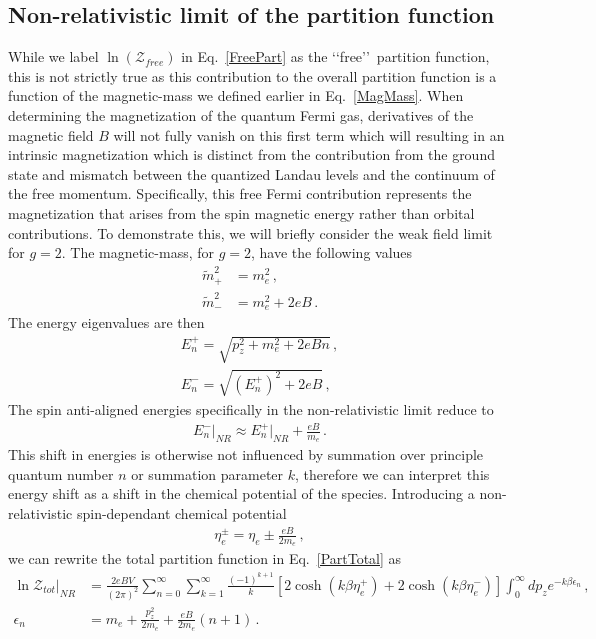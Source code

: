 \documentclass[Universe,article,submit,moreauthors,pdftex]{Definitions/mdpi}
\newcommand*{\req}[1]{Eq.~{\eqref{#1}}}
\begin{document}
\subsection{Non-relativistic limit of the partition function}
While we label $\ln(\mathcal{Z}_{free})$ in \req{FreePart} as the \lq\lq free\rq\rq\ partition function, this is not strictly true as this contribution to the overall partition function is a function of the magnetic-mass we defined earlier in \req{MagMass}. When determining the magnetization of the quantum Fermi gas, derivatives of the magnetic field $B$ will not fully vanish on this first term which will resulting in an intrinsic magnetization which is distinct from the contribution from the ground state and mismatch between the quantized Landau levels and the continuum of the free momentum. Specifically, this free Fermi contribution represents the magnetization that arises from the spin magnetic energy rather than orbital contributions. To demonstrate this, we will briefly consider the weak field limit for $g=2$. The magnetic-mass, for $g=2$, have the following values
\begin{align}
  \label{MagMassPlus} \tilde{m}_{+}^{2}&=m_{e}^{2}\,,\\
  \label{MagMassMinus} \tilde{m}_{-}^{2}&=m_{e}^{2}+2eB\,.
\end{align}
The energy eigenvalues are then
\begin{align}
  \label{EPlus} E_{n}^{+}=\sqrt{p_{z}^{2}+m_{e}^{2}+2eBn}\,,\\
  \label{EMinus} E_{n}^{-}=\sqrt{\left(E_{n}^{+}\right)^{2}+2eB}\,,
\end{align}
The spin anti-aligned energies specifically in the non-relativistic limit reduce to
\begin{align}
  \label{EMinusNR} E_{n}^{-}\vert_{NR}\approx E_{n}^{+}\vert_{NR}+\frac{eB}{m_{e}}\,.
\end{align}
This shift in energies is otherwise not influenced by summation over principle quantum number $n$ or summation parameter $k$, therefore we can interpret this energy shift as a shift in the chemical potential of the species. Introducing a non-relativistic spin-dependant chemical potential
\begin{align}
  \label{SpinChem} \eta_{e}^{\pm}=\eta_{e}\pm\frac{eB}{2m_{e}}\,,
\end{align}
we can rewrite the total partition function in \req{PartTotal} as
\begin{align}
  \label{PartTotalNR} \ln\mathcal{Z}_{tot}\vert_{NR}&=\frac{2eBV}{(2\pi)^{2}}\sum_{n=0}^{\infty}\sum_{k=1}^{\infty}\frac{(-1)^{k+1}}{k}\left[2\cosh(k\beta\eta_{e}^{+})+2\cosh(k\beta\eta_{e}^{-})\right]\int_{0}^{\infty}dp_{z}e^{-k\beta\epsilon_{n}}\,,\\
  \label{NREnergy} \epsilon_{n}&=m_{e}+\frac{p_{z}^{2}}{2m_{e}}+\frac{eB}{2m_{e}}\left(n+1\right)\,.
\end{align}
\end{document}
